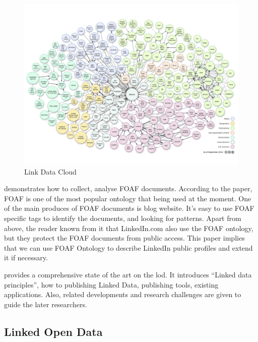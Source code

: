 \begin{description}
\begin{figure}[ht!]
\centering
\includegraphics[width=150mm]{images/link-data-cloud.png}
\caption{Link Data Cloud\protect\footnotemark}
\label{fig:LinkDataCloud}
\end{figure}
\end{description}


\cite{ding2005} demonstrates how to collect, analyse FOAF documents. According to the paper, FOAF is one of the most popular ontology that being used at the moment. One of the main produces of FOAF documents is blog website. It's easy to use FOAF specific tags to identify the documents, and looking for patterns. Apart from above, the reader known from it that LinkedIn.com also use the FOAF ontology, but they protect the FOAF documents from public access. This paper implies that we can use FOAF Ontology to describe LinkedIn public profiles and extend it if necessary. 


\cite{bizer2009} provides a comprehensive state of the art on the \gls{lod}. It introduces ``Linked data principles'', how to publishing Linked Data, publishing tools, existing applications. Also, related developments and research challenges are given to guide the later researchers.

\subsection{Linked Open Data}

